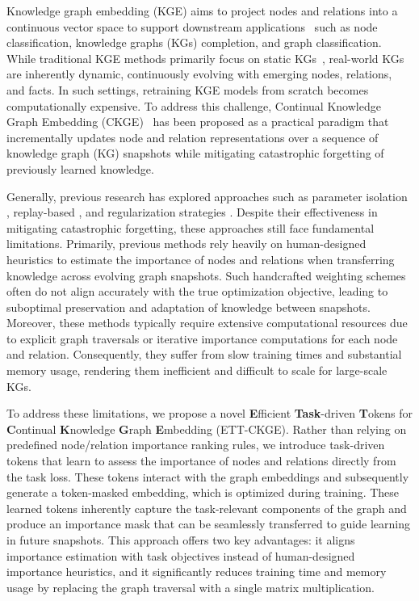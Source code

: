 \documentclass[runningheads]{llncs}
\begin{document}
Knowledge graph embedding (KGE) aims to project nodes and relations into a continuous vector space to support downstream applications~\cite{li2025improving,ju2024comprehensive,10825929,xiao2024hgtdp} such as node classification, knowledge graphs (KGs) completion, and graph classification. While traditional KGE methods primarily focus on static KGs~\cite{wang2017knowledge}, real-world KGs are inherently dynamic, continuously evolving with emerging nodes, relations, and facts. In such settings, retraining KGE models from scratch becomes computationally expensive. To address this challenge, Continual Knowledge Graph Embedding (CKGE)~\cite{cui2023lifelong} has been proposed as a practical paradigm that incrementally updates node and relation representations over a sequence of knowledge graph (KG) snapshots while mitigating catastrophic forgetting of previously learned knowledge. 

Generally, previous research has explored approaches such as parameter isolation \cite{rusu2016progressive,lomonaco2017core50}, replay-based \cite{rusu2016progressive,lomonaco2017core50}, and regularization strategies \cite{liu2024fast,liu2024towards,cui2023lifelong,10825244}. Despite their effectiveness in mitigating catastrophic forgetting, these approaches still face fundamental limitations. Primarily, previous methods rely heavily on human-designed heuristics to estimate the importance of nodes and relations when transferring knowledge across evolving graph snapshots. Such handcrafted weighting schemes often do not align accurately with the true optimization objective, leading to suboptimal preservation and adaptation of knowledge between snapshots. Moreover, these methods typically require extensive computational resources due to explicit graph traversals or iterative importance computations for each node and relation. Consequently, they suffer from slow training times and substantial memory usage, rendering them inefficient and difficult to scale for large-scale KGs.

To address these limitations, we propose a novel \textbf{E}fficient \textbf{Task}-driven \textbf{T}okens for \textbf{C}ontinual \textbf{K}nowledge \textbf{G}raph \textbf{E}mbedding (ETT-CKGE). Rather than relying on predefined node/relation importance ranking rules, we introduce task-driven tokens that learn to assess the importance of nodes and relations directly from the task loss. These tokens interact with the graph embeddings and subsequently generate a token-masked embedding, which is optimized during training. These learned tokens inherently capture the task-relevant components of the graph and produce an importance mask that can be seamlessly transferred to guide learning in future snapshots. This approach offers two key advantages: it aligns importance estimation with task objectives instead of human-designed importance heuristics, and it significantly reduces training time and memory usage by replacing the graph traversal with a single matrix multiplication. 
\end{document}
